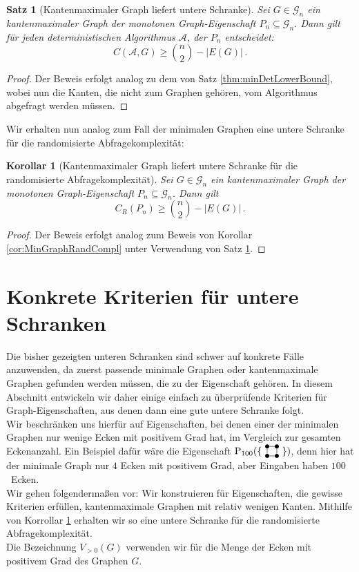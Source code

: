 \documentclass[10pt,a4paper, footheight=1mm]{scrreprt}
\newtheorem{Satz}[definition]{Satz}
\newtheorem{corollary}[definition]{Korollar}
\theoremstyle{definition}
\newcommand{\Square}{
\begin{tikzpicture}[main_node/.style={circle,fill=black},
inner sep=1.5pt, baseline=2pt]

    \node[main_node] (1) at (0,0) {};
    \node[main_node] (2) at (0.35, 0)  {};
    \node[main_node] (3) at (0.35, 0.35) {};
    \node[main_node] (4) at (0, 0.35) {};

    \draw (1) -- (2) -- (3) -- (4) -- (1);
\end{tikzpicture}
}
\begin{document}
\begin{Satz}[Kantenmaximaler Graph liefert untere Schranke]
\label{thm:EdgeMaxGraphLowerBound}
Sei $G\in \mathcal{G}_n$ ein kantenmaximaler Graph der monotonen
Graph-Eigenschaft $P_n \subseteq \mathcal{G}_n$.
Dann gilt für jeden deterministischen Algorithmus $\mathcal{A}$,
der $P_n$ entscheidet: 
$$ C(\mathcal{A}, G) \geq \binom{n}{2} - |E(G)|\,.$$
\end{Satz}
\begin{proof}
Der Beweis erfolgt analog zu dem von Satz \ref{thm:minDetLowerBound},
wobei nun die Kanten, die nicht zum Graphen gehören, vom Algorithmus
abgefragt werden müssen.
\end{proof}
Wir erhalten nun analog zum Fall der minimalen Graphen eine untere
Schranke für die randomisierte Abfragekomplexität:
\begin{corollary} [Kantenmaximaler Graph liefert untere Schranke
für die randomisierte Abfragekomplexität]
\label{thm:EdgeMaximalRandCompl}
Sei $G\in\mathcal{G}_n$ ein kantenmaximaler Graph der monotonen
Graph-Eigenschaft $P_n \subseteq \mathcal{G}_n$.
Dann gilt
$$ C_R(P_n) \geq \binom{n}{2} - |E(G)|\,.$$
\end{corollary}
\begin{proof}
Der Beweis erfolgt analog zum Beweis von Korollar \ref{cor:MinGraphRandCompl}
unter Verwendung von Satz \ref{thm:EdgeMaxGraphLowerBound}.
\end{proof}

\section{Konkrete Kriterien für untere Schranken}
Die bisher gezeigten unteren Schranken sind schwer auf konkrete
Fälle anzuwenden, da zuerst passende minimale Graphen oder kantenmaximale
Graphen gefunden werden müssen, die zu der Eigenschaft gehören.
In diesem Abschnitt entwickeln wir daher einige einfach zu überprüfende
Kriterien für Graph-Eigenschaften, aus denen dann eine gute
untere Schranke folgt. \\
Wir beschränken uns hierfür auf Eigenschaften, bei denen einer
der minimalen Graphen nur wenige Ecken mit positivem Grad hat,
im Vergleich zur gesamten Eckenanzahl. Ein Beispiel dafür wäre
die Eigenschaft $\operatorname{P}_{100}(\{ \ \Square \ \})$,
denn hier hat der minimale Graph nur $4$ Ecken mit positivem
Grad, aber Eingaben haben $100$~Ecken. \\
Wir gehen folgendermaßen vor: Wir konstruieren für Eigenschaften,
die gewisse Kriterien erfüllen, kantenmaximale Graphen mit 
relativ wenigen Kanten. Mithilfe von Korrollar 
\ref{thm:EdgeMaximalRandCompl} erhalten wir so eine untere Schranke
für die randomisierte Abfragekomplexität. \\
Die Bezeichnung $V_{>0}(G)$ verwenden wir für die
Menge der Ecken mit positivem Grad des Graphen $G$.
\end{document}
